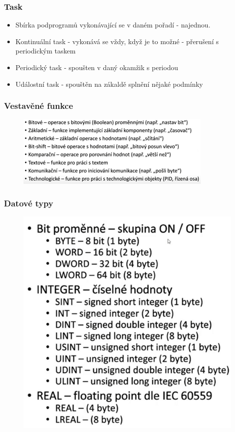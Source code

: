 \subsubsection*{Task}
\begin{itemize}
    \item Sbírka podprogramů vykonávající se v daném pořadí - najednou.
    \item Kontinuální task - vykonává se vždy, když je to možné - přerušení s periodickým taskem
    \item Periodický task - spoušten v daný okamžik s periodou
    \item Událostní task - spouštěn na zákaldě splnění nějaké podmínky
\end{itemize}

\subsubsection*{Vestavěné funkce}
\begin{figure}[h]
    \includegraphics[scale = 0.85]{img/Picture15.png}
\end{figure}

\subsubsection*{Datové typy}
\begin{figure}[!h]
    \includegraphics[scale = 0.85]{img/Picture16.png}
\end{figure}

